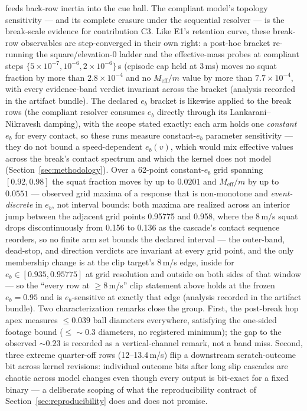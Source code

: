 feeds back-row inertia into the cue ball. The compliant model's topology
sensitivity --- and its complete erasure under the sequential resolver ---
is the break-scale evidence for contribution C3. Like E1's retention
curve, these break-row observables are step-converged in their own
right: a post-hoc bracket re-running the square/elevation-0 ladder and
the effective-mass probes at compliant steps
$\{5\times10^{-7}, 10^{-6}, 2\times10^{-6}\}$\,s (episode cap held at
3\,ms) moves no squat fraction by more than $2.8\times10^{-4}$ and no
$M_{\mathrm{eff}}/m$ value by more than $7.7\times10^{-4}$, with every
evidence-band verdict invariant across the bracket (analysis recorded
in the artifact bundle). The declared $e_b$ bracket is likewise applied
to the break rows (the compliant resolver consumes $e_b$ directly
through its Lankarani--Nikravesh damping), with the scope stated
exactly: each arm holds one \emph{constant} $e_b$ for every contact, so
these runs measure constant-$e_b$ parameter sensitivity --- they do not
bound a speed-dependent $e_b(v)$, which would mix effective values
across the break's contact spectrum and which the kernel does not model
(Section~\ref{sec:methodology}). Over a 62-point constant-$e_b$ grid
spanning $[0.92, 0.98]$
the squat fraction moves by up to $0.0201$ and $M_{\mathrm{eff}}/m$ by
up to $0.0551$ --- observed grid maxima of a response that is
non-monotone and \emph{event-discrete} in $e_b$, not interval bounds:
both maxima are realized across an interior jump between the adjacent
grid points 0.95775 and 0.958, where the 8\,m/s squat drops
discontinuously from 0.156 to 0.136 as the cascade's contact sequence
reorders, so no finite arm set bounds the declared interval --- the
outer-band, dead-stop, and
direction verdicts are
invariant at every grid point, and the only membership change is at
the clip target's
8\,m/s edge, inside for $e_b \in [0.935, 0.95775]$ at grid resolution
and outside on both sides of that window --- so the
``every row at $\geq 8$\,m/s'' clip statement above holds at the frozen
$e_b = 0.95$ and is $e_b$-sensitive at exactly that edge (analysis
recorded in the artifact bundle). Two characterization
remarks close the group. First, the post-break hop apex measures
$\leq 0.039$ ball diameters everywhere, satisfying the one-sided footage
bound (${\leq}{\sim}0.3$ diameters, no registered minimum); the gap to
the observed ${\sim}0.23$ is recorded as a vertical-channel remark, not a
band miss. Second, three extreme
quarter-off rows (12--13.4\,m/s) flip a downstream scratch-outcome bit
across kernel revisions: individual outcome bits after long slip cascades
are chaotic across model changes even though every output is bit-exact
for a fixed binary --- a deliberate scoping of what the reproducibility
contract of Section~\ref{sec:reproducibility} does and does not promise.

